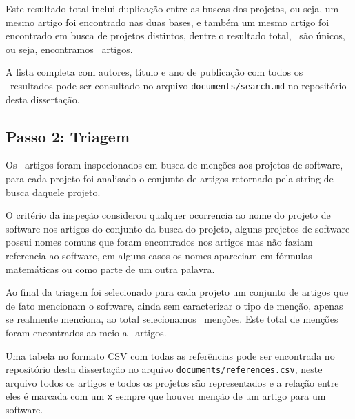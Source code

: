 Este resultado total inclui duplicação entre as buscas dos projetos, ou seja,
um mesmo artigo foi encontrado nas duas bases, e também um mesmo artigo foi
encontrado em busca de projetos distintos, dentre o resultado total,
\SearchUniqueCount \ são únicos, ou seja, encontramos \SearchUniqueCount \ artigos.

A lista completa com autores, título e ano de publicação com todos os
\SearchUniqueCount \ resultados pode ser consultado no arquivo
\texttt{documents/search.md} no repositório desta dissertação.


\subsection{Passo 2: Triagem}

Os \SearchUniqueCount \ artigos foram inspecionados em busca de menções aos
projetos de software, para cada projeto foi analisado o conjunto de artigos
retornado pela string de busca daquele projeto.

O critério da inspeção considerou qualquer ocorrencia ao nome do projeto de
software nos artigos do conjunto da busca do projeto, alguns projetos de
software possui nomes comuns que foram encontrados nos artigos mas não faziam
referencia ao software, em alguns casos os nomes apareciam em fórmulas
matemáticas ou como parte de um outra palavra.

Ao final da triagem foi selecionado para cada projeto um conjunto de artigos
que de fato mencionam o software, ainda sem caracterizar o tipo de menção,
apenas se realmente menciona, ao total selecionamos \ScreeningCount \ menções.
Este total de menções foram encontrados ao meio a \ScreeningUniqueCount \
artigos.

Uma tabela no formato CSV com todas as referências pode ser encontrada no repositório
desta dissertação no arquivo \texttt{documents/references.csv}, neste arquivo todos
os artigos e todos os projetos são representados e a relação entre eles é marcada com
um \texttt{x} sempre que houver menção de um artigo para um software.



